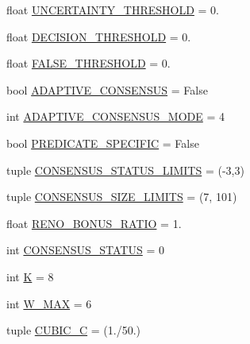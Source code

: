 \begin{DoxyCompactItemize}
\item 
float \mbox{\hyperlink{namespacedynamicfilterapp_1_1toggles_aaefdc27b85545eb4a910f5c65f7d8bbb}{U\+N\+C\+E\+R\+T\+A\+I\+N\+T\+Y\+\_\+\+T\+H\+R\+E\+S\+H\+O\+LD}} = 0.
\item 
float \mbox{\hyperlink{namespacedynamicfilterapp_1_1toggles_ac4442b6c569574253ef445d09952d3f0}{D\+E\+C\+I\+S\+I\+O\+N\+\_\+\+T\+H\+R\+E\+S\+H\+O\+LD}} = 0.
\item 
float \mbox{\hyperlink{namespacedynamicfilterapp_1_1toggles_a31317fa26792fa204392549329cc31cb}{F\+A\+L\+S\+E\+\_\+\+T\+H\+R\+E\+S\+H\+O\+LD}} = 0.
\item 
bool \mbox{\hyperlink{namespacedynamicfilterapp_1_1toggles_a7b6800fe9bb5df8c84060ed96d9711ac}{A\+D\+A\+P\+T\+I\+V\+E\+\_\+\+C\+O\+N\+S\+E\+N\+S\+US}} = False
\item 
int \mbox{\hyperlink{namespacedynamicfilterapp_1_1toggles_a394fa3f8531c2ecc987f982367a4af2d}{A\+D\+A\+P\+T\+I\+V\+E\+\_\+\+C\+O\+N\+S\+E\+N\+S\+U\+S\+\_\+\+M\+O\+DE}} = 4
\item 
bool \mbox{\hyperlink{namespacedynamicfilterapp_1_1toggles_a2826a54e707f46fbd0fa2f8f6219ead7}{P\+R\+E\+D\+I\+C\+A\+T\+E\+\_\+\+S\+P\+E\+C\+I\+F\+IC}} = False
\item 
tuple \mbox{\hyperlink{namespacedynamicfilterapp_1_1toggles_a36cac18f3d673a6f2cd86c88127e41b9}{C\+O\+N\+S\+E\+N\+S\+U\+S\+\_\+\+S\+T\+A\+T\+U\+S\+\_\+\+L\+I\+M\+I\+TS}} = (-\/3,3)
\item 
tuple \mbox{\hyperlink{namespacedynamicfilterapp_1_1toggles_a1a20e4a8af9569eaef5eb5b23f07222b}{C\+O\+N\+S\+E\+N\+S\+U\+S\+\_\+\+S\+I\+Z\+E\+\_\+\+L\+I\+M\+I\+TS}} = (7, 101)
\item 
float \mbox{\hyperlink{namespacedynamicfilterapp_1_1toggles_a18fd240c30a7c4a6ee9df12436a744ab}{R\+E\+N\+O\+\_\+\+B\+O\+N\+U\+S\+\_\+\+R\+A\+T\+IO}} = 1.
\item 
int \mbox{\hyperlink{namespacedynamicfilterapp_1_1toggles_a090eab76b7b0e234f422b87e30adf793}{C\+O\+N\+S\+E\+N\+S\+U\+S\+\_\+\+S\+T\+A\+T\+US}} = 0
\item 
int \mbox{\hyperlink{namespacedynamicfilterapp_1_1toggles_a2689c4b3931025b79053532a5f1b0a85}{K}} = 8
\item 
int \mbox{\hyperlink{namespacedynamicfilterapp_1_1toggles_add63171ca968cbd5ca4d60dfbf9a2746}{W\+\_\+\+M\+AX}} = 6
\item 
tuple \mbox{\hyperlink{namespacedynamicfilterapp_1_1toggles_a073a7aa1bc6b8c92d5682922759765fd}{C\+U\+B\+I\+C\+\_\+C}} = (1./50.)
\item 

\end{DoxyCompactItemize}

